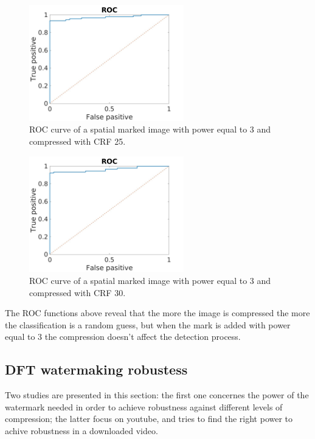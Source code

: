 \begin{figure}[h!]
\centering
\includegraphics[width=0.6\textwidth]{./img/ROC/ROC_gauss_3_25.jpg}
\caption{\small{ROC curve of a spatial marked image with power equal to 3 and compressed with CRF 25. }}
\label{fig:g3crf25}
\end{figure}
\begin{figure}[h!]
\centering
\includegraphics[width=0.6\textwidth]{./img/ROC/ROC_gauss_3_30.jpg}
\caption{\small{ROC curve of a spatial marked image with power equal to 3 and compressed with CRF 30. }}
\label{fig:g3crf30}
\end{figure}
\clearpage

The ROC functions above reveal that the more the image is compressed the more the classification is a random guess, but when the mark is added with power equal to 3 the compression doesn't affect the detection process.

\subsection{DFT watermaking robustess}

Two studies are presented in this section: the first one concernes the power of the watermark needed in order to achieve robustness against different levels of compression; the latter focus on youtube, and tries to find the right power to achive robustness in a downloaded video.
 

